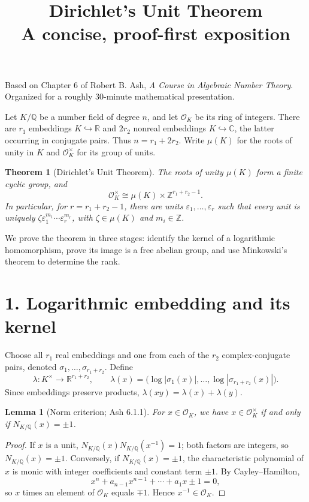 \documentclass[11pt]{article}
\title{\vspace{-1.1cm}\textbf{Dirichlet's Unit Theorem}\\[3pt]
\large A concise, proof-first exposition}
\author{}
\date{}
\newtheorem{theorem}{Theorem}
\newtheorem{lemma}{Lemma}
\newcommand{\OK}{\mathcal O_K}
\newcommand{\R}{\mathbb R}
\newcommand{\Z}{\mathbb Z}
\newcommand{\Q}{\mathbb Q}
\newcommand{\C}{\mathbb C}
\newcommand{\Nm}{N_{K/\Q}}
\begin{document}
\maketitle
\vspace{-1.1cm}
\begin{center}
\small Based on Chapter 6 of Robert B. Ash, \emph{A Course in Algebraic Number Theory}.\\
Organized for a roughly 30-minute mathematical presentation.
\end{center}
\vspace{2pt}

Let $K/\Q$ be a number field of degree $n$, and let $\OK$ be its ring of integers. There are $r_1$ embeddings $K\hookrightarrow\R$ and $2r_2$ nonreal embeddings $K\hookrightarrow\C$, the latter occurring in conjugate pairs. Thus $n=r_1+2r_2$. Write $\mu(K)$ for the roots of unity in $K$ and $\OK^\times$ for its group of units.

\begin{theorem}[Dirichlet's Unit Theorem]\label{thm:dut}
The roots of unity $\mu(K)$ form a finite cyclic group, and
\[
\boxed{\OK^\times\cong\mu(K)\times\Z^{r_1+r_2-1}.}
\]
In particular, for $r=r_1+r_2-1$, there are units $\varepsilon_1,\ldots,\varepsilon_r$ such that every unit is uniquely $\zeta\varepsilon_1^{m_1}\cdots\varepsilon_r^{m_r}$, with $\zeta\in\mu(K)$ and $m_i\in\Z$.
\end{theorem}

We prove the theorem in three stages: identify the kernel of a logarithmic homomorphism, prove its image is a free abelian group, and use Minkowski's theorem to determine the rank.

\section*{1. Logarithmic embedding and its kernel}
Choose all $r_1$ real embeddings and one from each of the $r_2$ complex-conjugate pairs, denoted $\sigma_1,\ldots,\sigma_{r_1+r_2}$. Define
\[
\lambda:K^\times\longrightarrow\R^{r_1+r_2},\qquad
\lambda(x)=\bigl(\log|\sigma_1(x)|,\ldots,\log|\sigma_{r_1+r_2}(x)|\bigr).
\]
Since embeddings preserve products, $\lambda(xy)=\lambda(x)+\lambda(y)$.

\begin{lemma}[Norm criterion; Ash 6.1.1]\label{lem:norm}
For $x\in\OK$, we have $x\in\OK^\times$ if and only if $\Nm(x)=\pm1$.
\end{lemma}
\begin{proof}
If $x$ is a unit, $\Nm(x)\Nm(x^{-1})=1$; both factors are integers, so $\Nm(x)=\pm1$. Conversely, if $\Nm(x)=\pm1$, the characteristic polynomial of $x$ is monic with integer coefficients and constant term $\pm1$. By Cayley--Hamilton,
\[
x^n+a_{n-1}x^{n-1}+\cdots+a_1x\pm1=0,
\]
so $x$ times an element of $\OK$ equals $\mp1$. Hence $x^{-1}\in\OK$.
\end{proof}
\end{document}
